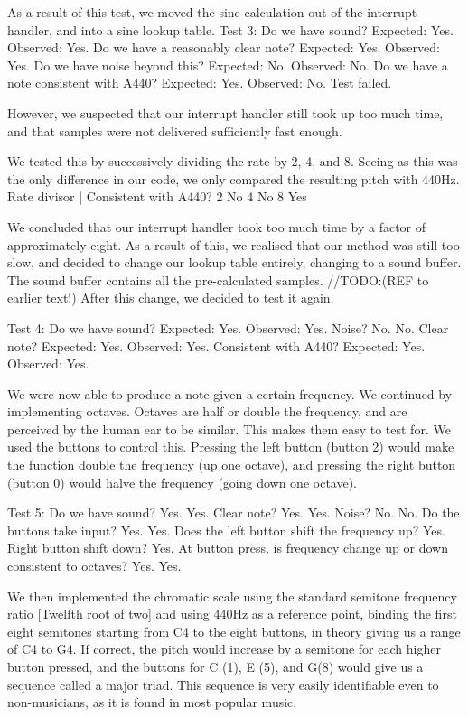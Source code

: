 As a result of this test, we moved the sine calculation out of the interrupt handler, and into a sine lookup table.
Test 3:
Do we have sound? Expected: Yes. Observed: Yes.
Do we have a reasonably clear note? Expected: Yes. Observed: Yes.
Do we have noise beyond this? Expected: No. Observed: No.
Do we have a note consistent with A440? Expected: Yes. Observed: No. Test failed.

However, we suspected that our interrupt handler still took up too much time, and that samples were not delivered sufficiently fast enough.

We tested this by successively dividing the rate by 2, 4, and 8. Seeing as this was the only difference in our code, we only compared the resulting pitch with 440Hz.
Rate divisor  |	Consistent with A440?
2 				No
4				No
8				Yes

We concluded that our interrupt handler took too much time by a factor of approximately eight. As a result of this, we realised that our method was still too slow, and decided to change our lookup table entirely, changing to a sound buffer. The sound buffer contains all the pre-calculated samples. //TODO:(REF to earlier text!) After this change, we decided to test it again.

Test 4:
Do we have sound? Expected: Yes. Observed: Yes.
Noise? No. No.
Clear note? Expected: Yes. Observed: Yes.
Consistent with A440? Expected: Yes. Observed: Yes.

We were now able to produce a note given a certain frequency. We continued by implementing octaves. Octaves are half or double the frequency, and are perceived by the human ear to be similar. This makes them easy to test for. We used the buttons to control this. Pressing the left button (button 2) would make the function double the frequency (up one octave), and pressing the right button (button 0) would halve the frequency (going down one octave).

Test 5:
Do we have sound? Yes. Yes.
Clear note? Yes. Yes.
Noise? No. No.
Do the buttons take input? Yes. Yes.
Does the left button shift the frequency up? Yes.
Right button shift down? Yes.
At button press, is frequency change up or down consistent to octaves? Yes. Yes.

We then implemented the chromatic scale using the standard semitone frequency ratio [Twelfth root of two] and using 440Hz as a reference point, binding the first eight semitones starting from C4 to the eight buttons, in theory giving us a range of C4 to G4. If correct, the pitch would increase by a semitone for each higher button pressed, and the buttons for C (1), E (5), and G(8) would give us a sequence called a major triad. This sequence is very easily identifiable even to non-musicians, as it is found in most popular music.

